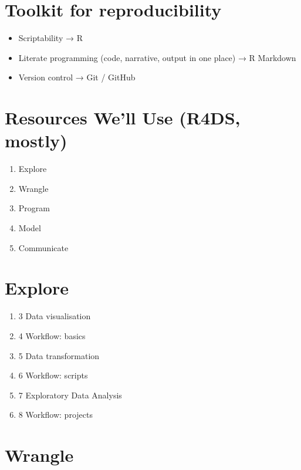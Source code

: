 \documentclass[
]{book}
\providecommand{\tightlist}{%
  \setlength{\itemsep}{0pt}\setlength{\parskip}{0pt}}
\theoremstyle{definition}
\theoremstyle{definition}
\theoremstyle{definition}
\theoremstyle{definition}
\theoremstyle{remark}
\begin{document}
\hypertarget{toolkit-for-reproducibility}{%
\section{Toolkit for reproducibility}\label{toolkit-for-reproducibility}}

\begin{itemize}
\tightlist
\item
  Scriptability → R
\item
  Literate programming (code, narrative, output in one place) → R Markdown
\item
  Version control → Git / GitHub
\end{itemize}

\hypertarget{resources-well-use-r4ds-mostly}{%
\section{Resources We'll Use (R4DS, mostly)}\label{resources-well-use-r4ds-mostly}}

\begin{enumerate}
\def\labelenumi{\arabic{enumi})}
\item
  Explore
\item
  Wrangle
\item
  Program
\item
  Model
\item
  Communicate
\end{enumerate}

\hypertarget{explore}{%
\section{Explore}\label{explore}}

\begin{enumerate}
\def\labelenumi{\alph{enumi})}
\setcounter{enumi}{1}
\tightlist
\item
  3 Data visualisation
\item
  4 Workflow: basics
\item
  5 Data transformation
\item
  6 Workflow: scripts
\item
  7 Exploratory Data Analysis
\item
  8 Workflow: projects
\end{enumerate}

\hypertarget{wrangle}{%
\section{Wrangle}\label{wrangle}}
\end{document}
